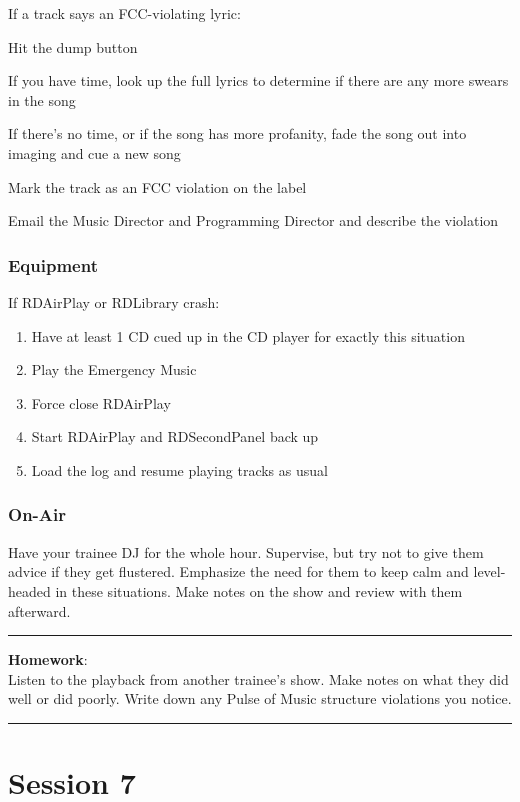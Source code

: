 \documentclass[]{witrman}
\newcommand{\makehomework}[1]{%
\vspace{1mm}
\rule{\textwidth}{1pt}
\textbf{Homework}:\\
#1\\
\rule[2mm]{\textwidth}{1pt}
}
\begin{document}
If a track says an FCC-violating lyric:
\begin{tightenumerate}
    \item Hit the dump button
    \item If you have time, look up the full lyrics to determine if there are
        any more swears in the song
    \item If there's no time, or if the song has more profanity, fade the song
        out into imaging and cue a new song
    \item Mark the track as an FCC violation on the label
    \item Email the Music Director and Programming Director and describe the
        violation
\end{tightenumerate}

\subsection{Equipment}

If RDAirPlay or RDLibrary crash:
\begin{enumerate}
    \item Have at least 1 CD cued up in the CD player for exactly this situation
    \item Play the Emergency Music
    \item Force close RDAirPlay
    \item Start RDAirPlay and RDSecondPanel back up
    \item Load the log and resume playing tracks as usual
\end{enumerate}

\subsection{On-Air}

Have your trainee DJ for the whole hour.  Supervise, but try not to give them
advice if they get flustered.  Emphasize the need for them to keep calm and
level-headed in these situations.  Make notes on the show and review with them
afterward.

\makehomework{Listen to the playback from another trainee's show.  Make notes on
what they did well or did poorly.  Write down any Pulse of Music structure
violations you notice.}


\chapter{Session 7}
\end{document}
